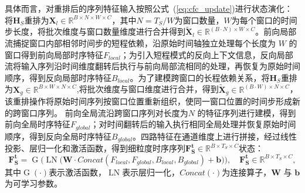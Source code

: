 \documentclass[a4paper, 12pt]{article}
\begin{document}
具体而言，对重排后的序列特征输入按照公式~(\ref{eq:cfc_update})进行状态演化：将$\mathbf{H}_S$重排为$\mathbf{X}_l\in \mathbb{R}^{B \times N \times W \times C}$，其中$N=T_S/W$为窗口数量，$W$为每个窗口的时间步长度，将批次维度与窗口数量维度进行合并得到$\tilde{\mathbf{X}}_l \in \mathbb{R}^{(B \cdot N) \times W \times C}$。前向局部流捕捉窗口内部相邻时间步的短程依赖，沿原始时间轴独立处理每个长度为 $W$ 的窗口得到前向局部时序特征$F_{local}$；为引入短程模式的反向上下文信息，反向局部流将输入序列沿时间维度翻转后执行与前向局部流相同的处理，再恢复为原始时间顺序，得到反向局部时序特征$B_{local}$。为了建模跨窗口的长程依赖关系，将$\mathbf{H}_S$重排为$\mathbf{X}_g\in \mathbb{R}^{B \times W \times N \times C}$,将批次维度与窗口维度进行合并，得到$\tilde{\mathbf{X}}_g \in \mathbb{R}^{(B \cdot W) \times N \times C}$，该重排操作将原始时间序列按窗口位置重新组织，使同一窗口位置的时间步形成新的跨窗口序列。
前向全局流沿跨窗口序列对长度为$N$ 的特征序列进行建模，得到前向全局时序特征$F_{global}$；对时间翻转后的输入执行相同全局处理并恢复原始时间顺序，得到反向全局时序特征$B_{global}$。四路特征在通道维度上进行拼接，经过线性投影、层归一化和激活函数，得到细粒度时序序列$\mathbf{F_S^t}\in \mathbb{R}^{B \times T_S \times C}$状态：
\begin{equation}
\mathbf{F_S^t}
=
\operatorname{G}
\Big(
\operatorname{LN}
\big(
\mathbf{W}\cdot Concat(F_{local},F_{global},B_{local},B_{global})
+ \mathbf{b}
\big)
\Big),
\quad
\mathbf{F_S^t} \in \mathbb{R}^{B \times T_S \times C},
\end{equation}其中$\operatorname{G}(\cdot)$表示激活函数，$\operatorname{LN}$表示层归一化，$Concat(\cdot)$为连接算子，$\mathbf{W}$ 与 $\mathbf{b}$ 为可学习参数。
\end{document}

